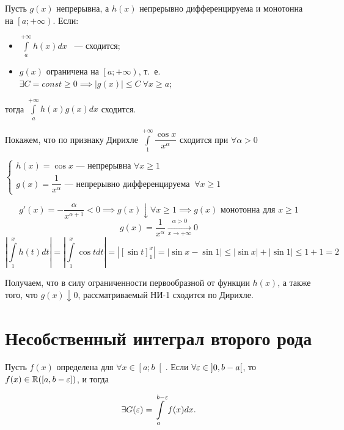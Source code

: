 \documentclass[../../main.tex]{subfiles}
\begin{document}
\begin{thm}
Пусть $g(x)$ непрерывна, а $h(x)$ непрерывно дифференцируема и монотонна на 
$\left[a; +\infty \right)$. Если:
\begin{itemize}
\item[а)] $\displaystyle\int\limits_{a}^{+\infty}h(x)dx$ ~--- сходится;

\item[б)] $g(x)$ ограничена на $\left[a; +\infty\right)$, т.~е. $\exists C = 
const\geq 0 \implies \left| g(x) \right| \leq C \ \forall x \geq a$;
\end{itemize}
тогда $\displaystyle\int\limits_{a}^{+\infty} h(x)g(x)dx$ сходится.
\end{thm}

\begin{exmp}
 Покажем, что по признаку Дирихле
 $\displaystyle\int\limits_{1}^{+\infty}\dfrac{\cos{x}}{x^{\alpha}}$ сходится при 
 $\forall \alpha > 0$
 
 $\begin{cases}
 h(x) = \cos{x} \text{~--- непрерывна } \forall x \geq 1\\
 g(x) = \dfrac{1}{x^{\alpha}} \text{~--- непрерывно дифференцируема }\ \forall 
 x \geq 1
 \end{cases}$
 
 \[g'(x) = -\dfrac{\alpha}{x^{\alpha + 1}} < 0 \implies g(x) \downarrow \forall 
 x \geq 1 \implies g(x) \text{ монотонна для $x \geq 1$}\]
 \[g(x) = \dfrac{1}{x^{\alpha}} \xrightarrow[x \to +\infty]{\alpha > 0} 0\]
 \[\left| \int\limits_{1}^{x}h(t)dt\right| = 
 \left|\int\limits_{1}^{x}\cos{t}dt\right| = \left| \left[ 
 \sin{t}\right]_{1}^{x} \right| = \left| \sin{x} - \sin{1} \right| \leq \left| 
 \sin{x} \right| + \left| \sin{1} \right| \leq 1 + 1 = 2\]

  Получаем, что в силу ограниченности первообразной от функции $h(x)$, а также того, что $g(x) \downarrow 0$, рассматриваемый НИ-1 сходится по Дирихле.
 \end{exmp}
 
 \section{Несобственный интеграл второго рода}
 
 Пусть $f(x)$ определена для $\forall x \in \left[a; b \right[$. Если $\forall 
 \varepsilon \in \left] 0, b - a \right[$, то $f(x) \in \mathbb{R}(\left[a, b - 
 \varepsilon\right])$, и тогда

\begin{equation}\label{lec8:2}
\exists G(\varepsilon) = \displaystyle\int\limits_{a}^{b - \varepsilon}f(x)dx.
\end{equation}
\end{document}
